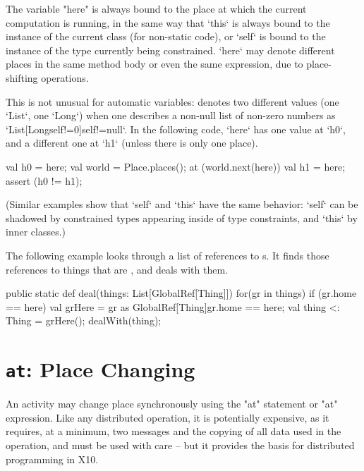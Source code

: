 The variable \xcd"here" is always bound to the place at which the current
computation is running, in the same way that \xcd`this` is always bound to the
instance of the current class (for non-static code), or \xcd`self` is bound to
the instance of the type currently being constrained.  
\xcd`here` may denote different places in the same method body or even the
same expression, due to
place-shifting operations.


This is not unusual for automatic variables:   denotes 
two different values (one \xcd`List`, one \xcd`Long`) 
when one describes a non-null list of non-zero numbers as
\xcd`List[Long{self!=0}]{self!=null}`. In the following 
code, \xcd`here` has one value at 
\xcd`h0`, and a different one at \xcd`h1` (unless there is only one place).
\begin{xten}
val h0 = here;
val world = Place.places();
at (world.next(here)) {
  val h1 = here; 
  assert (h0 != h1);
}
\end{xten}
% 
\noindent
(Similar examples show that \xcd`self` and \xcd`this` have the same behavior:
\xcd`self` can be shadowed by constrained types appearing inside of type
constraints, and \xcd`this` by inner classes.)



The following example looks through a list of references to s.  
It finds those references to things that are , and deals with them.  
\begin{xten}
  public static def deal(things: List[GlobalRef[Thing]]) {
     for(gr in things) {
        if (gr.home == here) {
           val grHere = 
               gr as GlobalRef[Thing]{gr.home == here};
           val thing <: Thing = grHere();
           dealWith(thing);
        }
     }
  }
\end{xten}
% 

\section{ {\tt at}: Place Changing}\label{AtStatement}

An activity may change place synchronously using the \xcd"at" statement or
\xcd"at" expression. Like any distributed operation, it is 
potentially expensive, as it requires, at a minimum, two messages
and the copying of all data used in the operation, and must be used with care
-- but it provides the basis for distributed programming in X10.

